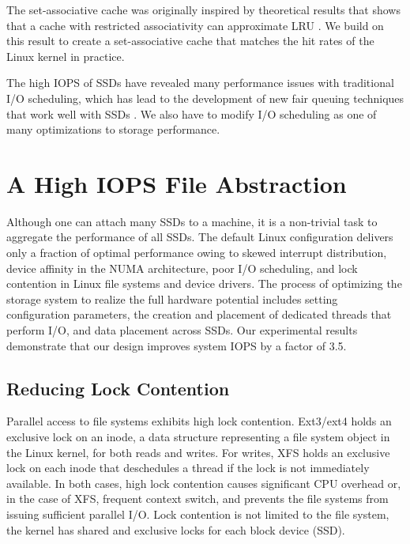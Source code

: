 The set-associative cache  was originally inspired by theoretical results 
that shows that a cache with restricted associativity can approximate LRU \cite{Sen02}.
We build on this result to create a set-associative cache that matches the 
hit rates of the Linux kernel in practice.

The high IOPS of SSDs have revealed many performance issues with 
traditional I/O scheduling, which has lead to the development of 
new fair queuing techniques that work well with SSDs \cite{Park12}.
We also have to modify I/O scheduling as one of many optimizations to 
storage performance.


\section{A High IOPS File Abstraction}

Although one can attach many SSDs to a machine, 
it is a non-trivial task to  aggregate the performance of all SSDs.
The default Linux configuration delivers only a fraction of optimal
performance owing to skewed interrupt distribution, device affinity
in the NUMA architecture, poor I/O scheduling, and lock contention
in Linux file systems and device drivers.
The process of optimizing the storage system to realize the 
full hardware potential includes setting configuration parameters,
the creation and placement of dedicated threads that perform I/O,
and data placement across SSDs.  
Our experimental results demonstrate that our design
improves system IOPS by a factor of 3.5.

\subsection{Reducing Lock Contention}

Parallel access to file systems exhibits high lock contention. 
Ext3/ext4 holds an exclusive lock on an inode, a data structure
representing a file system object in the Linux kernel, for both reads and
writes.  For writes, XFS holds an exclusive lock on each inode that 
deschedules a thread if the lock is not immediately available. 
In both cases, high lock contention causes significant CPU overhead or,
in the case of XFS, frequent context switch, and prevents the file systems
from issuing sufficient parallel I/O.
Lock contention is not limited to the file system, the kernel has
shared and exclusive locks for each block device (SSD).

